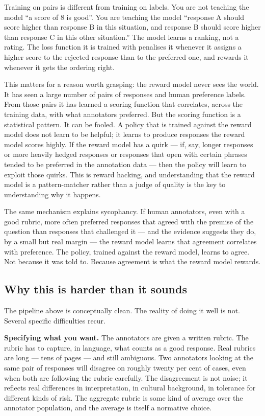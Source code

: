 Training on pairs is different from training on labels.
You are not teaching the model ``a score of 8 is good''.
You are teaching the model ``response A should score higher
than response B in this situation, and response B should score
higher than response C in this other situation.'' The model
learns a ranking, not a rating. The loss function it is
trained with penalises it whenever it assigns a higher score
to the rejected response than to the preferred one, and
rewards it whenever it gets the ordering right.

This matters for a reason worth grasping: the reward model
never sees the world. It has seen a large number of pairs of
responses and human preference labels. From those pairs it has
learned a scoring function that correlates, across the training
data, with what annotators preferred. But the scoring function
is a statistical pattern. It can be fooled. A policy that is
trained against the reward model does not learn to be helpful;
it learns to produce responses the reward model scores highly.
If the reward model has a quirk --- if, say, longer responses
or more heavily hedged responses or responses that open with
certain phrases tended to be preferred in the annotation data
--- then the policy will learn to exploit those quirks. This
is reward hacking, and understanding that the reward model is
a pattern-matcher rather than a judge of quality is the key
to understanding why it happens.

The same mechanism explains sycophancy. If human annotators,
even with a good rubric, more often preferred responses that
agreed with the premise of the question than responses that
challenged it --- and the evidence suggests they do, by a
small but real margin --- the reward model learns that
agreement correlates with preference. The policy, trained
against the reward model, learns to agree. Not because it
was told to. Because agreement is what the reward model
rewards.

\subsection*{Why this is harder than it sounds}

The pipeline above is conceptually clean. The reality of doing
it well is not. Several specific difficulties recur.

\textbf{Specifying what you want.} The annotators are given a
written rubric. The rubric has to capture, in language, what
counts as a good response. Real rubrics are long --- tens of
pages --- and still ambiguous. Two annotators looking at the
same pair of responses will disagree on roughly twenty per
cent of cases, even when both are following the rubric
carefully. The disagreement is not noise; it reflects real
differences in interpretation, in cultural background, in
tolerance for different kinds of risk. The aggregate rubric is
some kind of average over the annotator population, and the
average is itself a normative choice.

